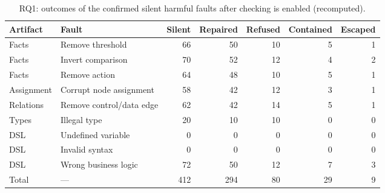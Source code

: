 \begin{table}[!htbp]
\centering
\caption{RQ1: outcomes of the confirmed silent harmful faults after checking is enabled (recomputed).}
\label{tab:fault-containment}
\footnotesize\setlength{\tabcolsep}{3pt}
\begin{tabular*}{\linewidth}{@{\extracolsep{\fill}}llrrrrr@{}}
\toprule
Artifact & Fault & Silent & Repaired & Refused & Contained & Escaped \\
\midrule
Facts & Remove threshold & 66 & 50 & 10 & 5 & 1 \\
Facts & Invert comparison & 70 & 52 & 12 & 4 & 2 \\
Facts & Remove action & 64 & 48 & 10 & 5 & 1 \\
Assignment & Corrupt node assignment & 58 & 42 & 12 & 3 & 1 \\
Relations & Remove control/data edge & 62 & 42 & 14 & 5 & 1 \\
Types & Illegal type & 20 & 10 & 10 & 0 & 0 \\
DSL & Undefined variable & 0 & 0 & 0 & 0 & 0 \\
DSL & Invalid syntax & 0 & 0 & 0 & 0 & 0 \\
DSL & Wrong business logic & 72 & 50 & 12 & 7 & 3 \\
\midrule
Total & --- & 412 & 294 & 80 & 29 & 9 \\
\bottomrule
\end{tabular*}
\end{table}
